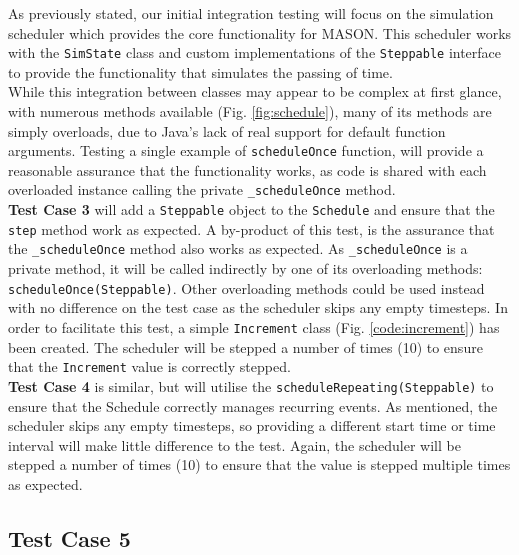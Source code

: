 \documentclass[11pt]{article}
\begin{document}
As previously stated, our initial integration testing will focus on the simulation scheduler which provides the core functionality for MASON.
This scheduler works with the \texttt{SimState} class and custom implementations of the \texttt{Steppable} interface to provide the functionality that simulates the passing of time.
\\

While this integration between classes may appear to be complex at first glance, with numerous methods available (Fig. \ref{fig:schedule}), many of its methods are simply overloads,  due to Java's lack of real support for default function arguments.
Testing a single example of \texttt{scheduleOnce} function, will provide a reasonable assurance that the functionality works, as code is shared with each overloaded instance calling the private \texttt{\_scheduleOnce} method.
\\

\textbf{Test Case 3} will add a \texttt{Steppable} object to the \texttt{Schedule} and ensure that the \texttt{step} method work as expected.
A by-product of this test, is the assurance that the \texttt{\_scheduleOnce} method also works as expected.
As \texttt{\_scheduleOnce} is a private method, it will be called indirectly by one of its overloading methods: \texttt{scheduleOnce(Steppable)}.
Other overloading methods could be used instead with no difference on the test case as the scheduler skips any empty timesteps.
In order to facilitate this test, a simple \texttt{Increment} class (Fig. \ref{code:increment}) has been created.
The scheduler will be stepped a number of times (10) to ensure that the \texttt{Increment} value is correctly stepped.
\\

\textbf{Test Case 4} is similar, but will utilise the \texttt{scheduleRepeating(Steppable)} to ensure that the Schedule correctly manages recurring events.
As mentioned, the scheduler skips any empty timesteps, so providing a different start time or time interval will make little difference to the test.
Again, the scheduler will be stepped a number of times (10) to ensure that the value is stepped multiple times as expected.

\subsection{Test Case 5}
\end{document}
